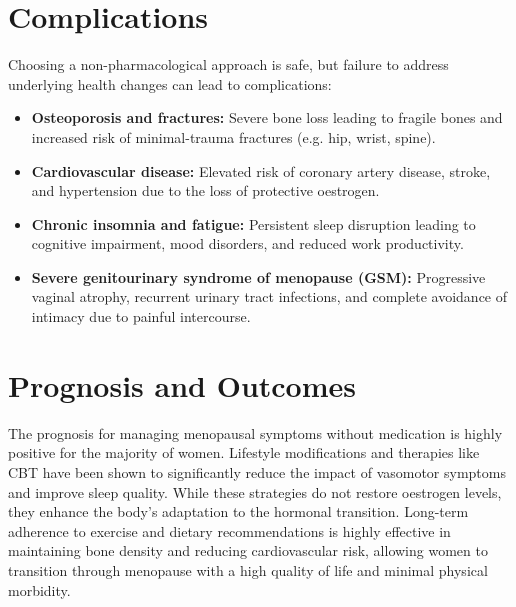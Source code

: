 \section*{Complications}
Choosing a non-pharmacological approach is safe, but failure to address underlying health changes can lead to complications:
\begin{itemize}
    \item \textbf{Osteoporosis and fractures:} Severe bone loss leading to fragile bones and increased risk of minimal-trauma fractures (e.g. hip, wrist, spine).
    \item \textbf{Cardiovascular disease:} Elevated risk of coronary artery disease, stroke, and hypertension due to the loss of protective oestrogen.
    \item \textbf{Chronic insomnia and fatigue:} Persistent sleep disruption leading to cognitive impairment, mood disorders, and reduced work productivity.
    \item \textbf{Severe genitourinary syndrome of menopause (GSM):} Progressive vaginal atrophy, recurrent urinary tract infections, and complete avoidance of intimacy due to painful intercourse.
\end{itemize}

\section*{Prognosis and Outcomes}
The prognosis for managing menopausal symptoms without medication is highly positive for the majority of women. Lifestyle modifications and therapies like CBT have been shown to significantly reduce the impact of vasomotor symptoms and improve sleep quality. While these strategies do not restore oestrogen levels, they enhance the body's adaptation to the hormonal transition. Long-term adherence to exercise and dietary recommendations is highly effective in maintaining bone density and reducing cardiovascular risk, allowing women to transition through menopause with a high quality of life and minimal physical morbidity.

